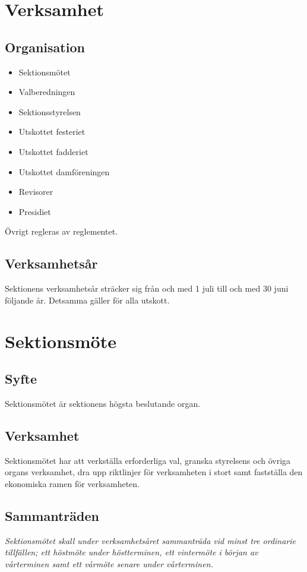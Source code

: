 \documentclass{datateknologsektionen-document}
\begin{document}
  \section{Verksamhet}
    \subsection{Organisation}
      \begin{itemize}
        \item Sektionsmötet
        \item Valberedningen
        \item Sektionsstyrelsen
        \item Utskottet festeriet
        \item Utskottet fadderiet
        \item Utskottet damföreningen
        \item Revisorer
        \item Presidiet
      \end{itemize}
      Övrigt regleras av reglementet.

    \subsection{Verksamhetsår}
      Sektionens verksamhetsår sträcker sig från och med 1 juli till och med 30 juni följande
      år. Detsamma gäller för alla utskott.
  \section{Sektionsmöte}
    \subsection{Syfte}
      Sektionsmötet är sektionens högsta beslutande organ.
    \subsection{Verksamhet}
      Sektionsmötet har att verkställa erforderliga val, granska styrelsens och övriga organs
      verksamhet, dra upp riktlinjer för verksamheten i stort samt fastställa den ekonomiska
      ramen för verksamheten.
    \subsection{Sammanträden}
      \textit{Sektionsmötet skall under verksamhetsåret sammanträda vid minst tre ordinarie tillfällen;
      ett höstmöte under höstterminen, ett vintermöte i början av vårterminen samt ett vårmöte
      senare under vårterminen.
      }
\end{document}
